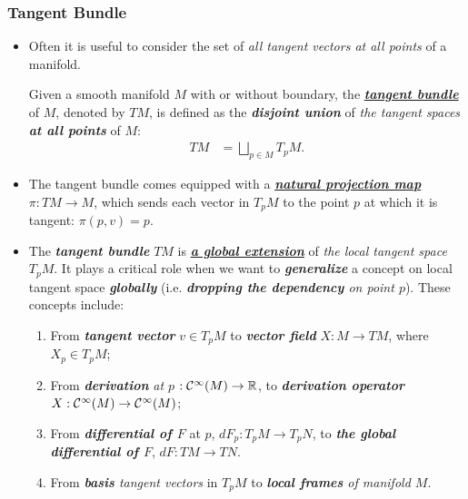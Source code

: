 \documentclass[11pt]{article}
\begin{document}
\subsubsection{Tangent Bundle}
\begin{itemize}
\item Often it is useful to consider the set of \emph{all tangent vectors at all points} of a manifold. 
\begin{definition}
Given a smooth manifold $M$ with or without boundary, the \underline{\emph{\textbf{tangent bundle}}} of $M$, denoted by $TM$, is defined as the \emph{\textbf{disjoint union}} of \emph{the tangent spaces} \emph{\textbf{at all points}} of $M$:
\begin{align*}
TM &= \bigsqcup_{p \in M}T_{p}M.
\end{align*}
\end{definition}

\item \begin{definition}
The tangent bundle comes equipped with a \underline{\emph{\textbf{natural projection map}}} $\pi: TM \rightarrow M$, which sends each vector in $T_{p}M$ to the point $p$ at which it is tangent: $\pi(p, v) = p$.
\end{definition}

\item \begin{remark}
The \emph{\textbf{tangent bundle}} $TM$ is \underline{\emph{\textbf{a global extension}}} of \emph{the local tangent space} $T_pM$. It plays a critical role when we want to \emph{\textbf{generalize}} a concept on local tangent space \emph{\textbf{globally}} (i.e. \emph{\textbf{dropping the dependency} on point $p$}). These concepts include:
\begin{enumerate}
\item From \emph{\textbf{tangent vector}} $v\in T_pM$ to \emph{\textbf{vector field}} $X: M \rightarrow TM$, where $X_p \in T_pM$;
\item From \emph{\textbf{derivation}} \emph{at $p$} $: {\mathcal C}^{\infty}(M) \rightarrow {\mathbb R}$, to \emph{\textbf{derivation operator}} $X: {\mathcal C}^{\infty}(M) \rightarrow {\mathcal C}^{\infty}(M)$;
\item From \emph{\textbf{differential of $F$}} at $p$, $dF_p: T_pM \rightarrow T_pN$, to \emph{\textbf{the global differential of $F$}}, $dF: TM \rightarrow TN$.
\item From \emph{\textbf{basis} tangent vectors} in $T_pM$ to \emph{\textbf{local frames} of manifold $M$}.
\end{enumerate}
\end{remark}


\end{itemize}
\end{document}
